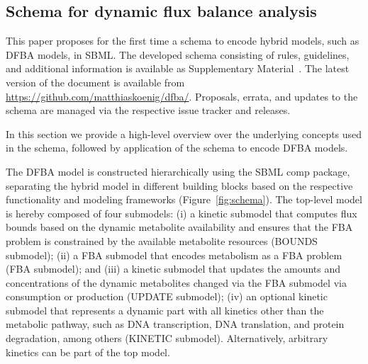 \documentclass{bioinfo}
\begin{document}
\subsection{Schema for dynamic flux balance analysis}
This paper proposes for the first time a schema to encode hybrid models, such as DFBA models, in SBML. The developed schema consisting of rules, guidelines, and additional information is available as Supplementary Material~. The latest version of the document is available from \href{https://github.com/matthiaskoenig/dfba/}{https://github.com/matthiaskoenig/dfba/}. Proposals, errata, and updates to the schema are managed via the respective issue tracker and releases.

In this section we provide a high-level overview over the underlying concepts used in the schema, followed by application of the schema to encode DFBA models.

The DFBA model is constructed hierarchically using the SBML comp package, separating the hybrid model in different building blocks based on the respective functionality and modeling frameworks (Figure~\ref{fig:schema}). The top-level model is hereby composed of four submodels: (i) a kinetic submodel that computes flux bounds based on the dynamic metabolite availability and ensures that the FBA problem is constrained by the available metabolite resources (BOUNDS submodel); (ii) a FBA submodel that encodes metabolism as a FBA problem (FBA submodel); and (iii) a kinetic submodel that updates the amounts and concentrations of the dynamic metabolites changed via the FBA submodel via consumption or production (UPDATE submodel); (iv) an optional kinetic submodel that represents a dynamic part with all kinetics other than the metabolic pathway, such as DNA transcription, DNA translation, and protein degradation, among others (KINETIC submodel). Alternatively, arbitrary kinetics can be part of the top model.
\end{document}
